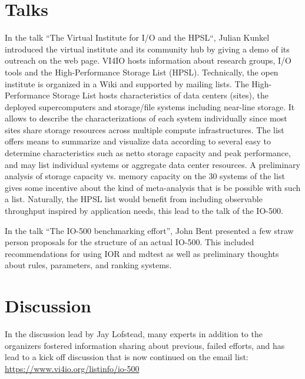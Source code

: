 \documentclass{llncs}
\begin{document}
\section{Talks}


In the talk “The Virtual Institute for I/O and the HPSL“, Julian Kunkel introduced the virtual institute and its community hub by giving a demo of its outreach on the web page. VI4IO hosts information about research groups, I/O tools and the High-Performance Storage List (HPSL). Technically, the open institute is organized in a Wiki and supported by mailing lists. 
The High-Performance Storage List hosts characteristics of data centers (sites), the deployed supercomputers and storage/file systems including near-line storage. It allows to describe the characterizations of each system individually since most sites share storage resources across multiple compute infrastructures. The list offers means to summarize and visualize data according to several easy to determine characteristics such as netto storage capacity and peak performance, and may list individual systems or aggregate data center resources.  A preliminary analysis of storage capacity vs. memory capacity on the 30 systems of the list gives some incentive about the kind of meta-analysis that is be possible with such a list. Naturally, the HPSL list would benefit from including observable throughput inspired by application needs, this lead to the talk of the IO-500.


In the talk “The IO-500 benchmarking effort”, John Bent presented a few straw person proposals for the structure of an actual IO-500.  This included recommendations for using IOR and mdtest as well as preliminary thoughts about rules, parameters, and ranking systems.




\section{Discussion}


In the discussion lead by Jay Lofstead, many experts in addition to the organizers fostered information sharing about previous, failed efforts, and has lead to a kick off discussion that is now continued on the email list: \\
\url {https://www.vi4io.org/listinfo/io-500}
\end{document}

